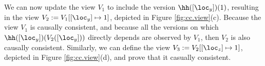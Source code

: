 % 
We can now update the view $V_1$ to include the version $\hh([\loc_y])(1)$, 
resulting in the view $V_2 := V_1[ [\loc_y] \mapsto 1]$, depicted in Figure \ref{fig:cc.view}(c). 
Because the view $V_1$ is 
causally consistent, and because all the versions on which $\hh([\loc_y])(V_2([\loc_y]))$ directly depends
are observed by $V_1$, then $V_2$ is also causally consistent. Similarly, we can define 
the view $V_3 := V_2[[\loc_z] \mapsto 1]$, depicted in Figure \ref{fig:cc.view}(d), 
and prove that it casually consistent. 


